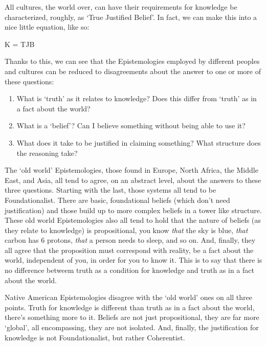 All cultures, the world over, can have their requirements for knowledge be characterized, roughly, as `True Justified Belief'. In fact, we can make this into a nice little equation, like so:

\begin{center}
K = TJB
\end{center}

Thanks to this, we can see that the Epistemologies employed by different peoples and cultures can be reduced to disagreements about the answer to one or more of these questions:
\begin{enumerate}
\item What is `truth' as it relates to knowledge? Does this differ from `truth' as in a fact about the world?
\item What is a `belief'? Can I believe something without being able to use it?
\item What does it take to be justified in claiming something? What structure does the reasoning take?
\end{enumerate}
The `old world' Epistemologies, those found in Europe, North Africa, the Middle East, and Asia, all tend to agree, on an abstract level, about the answers to these three questions. Starting with the last, those systems all tend to be Foundationalist. There are basic, foundational beliefs (which don't need justification) and those build up to more complex beliefs in a tower like structure. These old world Epistemologies also all tend to hold that the nature of beliefs (as they relate to knowledge) is propositional, you know \emph{that} the sky is blue, \emph{that} carbon has 6 protons, \emph{that} a person needs to sleep, and so on. And, finally, they all agree that the proposition must correspond with reality, be a fact about the world, independent of you, in order for you to know it. This is to say that there is no difference betweem truth as a condition for knowledge and truth as in a fact about the world. 

Native American Epistemologies disagree with the `old world' ones on all three points.\autocite[18]{Burkhart1} Truth for knowledge is different than truth as in a fact about the world, there's something more to it. Beliefs are not just propositional, they are far more `global', all encompassing, they are not isolated. And, finally, the justification for knowledge is not Foundationalist, but rather Coherentist.   
